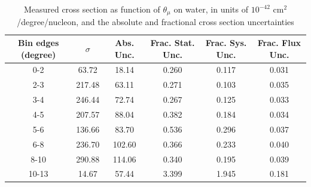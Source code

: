 \documentclass[../main.tex]{subfiles}
\begin{document}
\begin{table}
  \centering
  \renewcommand{\arraystretch}{1.15}
  \caption{Systematic covariance matrix of measured cross section in $p_{\mu}$ on water, in units of $10^{-84}$ $(\text{cm}^2$/GeV/c/nucleon$)^2$}
  \label{tbl:sysnucleonnuc10muon_pc}
\end{table}
\pagebreak
\begin{turnpage}
\end{turnpage}
\begin{table}
  \centering
  \renewcommand{\arraystretch}{1.15}
  \caption{Measured cross section as function of $\theta_{\mu}$ on water, in units of $10^{-42}$ $\text{cm}^2$/degree/nucleon, and the absolute and fractional cross section uncertainties}
    \begin{tabular}{c||c|c||c|c|c}
      Bin edges (degree) &  $\sigma$  &  Abs. Unc.  &  Frac. Stat. Unc.  &  Frac. Sys. Unc.  &  Frac. Flux Unc. \\
      \hline
      \hline
      0-2 & 63.72 & 18.14 & 0.260 & 0.117 & 0.031\\
      2-3 & 217.48 & 63.11 & 0.271 & 0.103 & 0.035\\
      3-4 & 246.44 & 72.74 & 0.267 & 0.125 & 0.033\\
      4-5 & 207.57 & 88.04 & 0.382 & 0.184 & 0.034\\
      5-6 & 136.66 & 83.70 & 0.536 & 0.296 & 0.037\\
      6-8 & 236.70 & 102.60 & 0.366 & 0.233 & 0.040\\
      8-10 & 290.88 & 114.06 & 0.340 & 0.195 & 0.039\\
      10-13 & 14.67 & 57.44 & 3.399 & 1.945 & 0.181
    \end{tabular}
  \label{tbl:datanucleonnuc10muon_thetaa}
\end{table}
\end{document}
